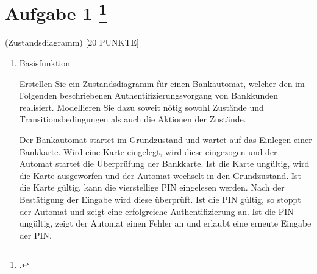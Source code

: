 \documentclass{lehramt-informatik-aufgabe}
\begin{document}
\section{Aufgabe 1
\footcite{66116:2020:03}}

 (Zustandsdiagramm) [20 PUNKTE]

\begin{enumerate}


\item Basisfunktion

Erstellen Sie ein Zustandsdiagramm für einen Bankautomat, welcher den im
Folgenden beschriebenen Authentifizierungsvorgang von Bankkunden
realisiert. Modellieren Sie dazu soweit nötig sowohl Zustände und
Transitionsbedingungen als auch die Aktionen der Zustände.

Der Bankautomat startet im Grundzustand und wartet auf das Einlegen
einer Bankkarte. Wird eine Karte eingelegt, wird diese eingezogen und
der Automat startet die Überprüfung der Bankkarte. Ist die Karte
ungültig, wird die Karte ausgeworfen und der Automat wechselt in den
Grundzustand. Ist die Karte gültig, kann die vierstellige PIN eingelesen
werden. Nach der Bestätigung der Eingabe wird diese überprüft. Ist die
PIN gültig, so stoppt der Automat und zeigt eine erfolgreiche
Authentifizierung an. Ist die PIN ungültig, zeigt der Automat einen
Fehler an und erlaubt eine erneute Eingabe der PIN.

\begin{liAntwort}
\end{liAntwort}


\end{enumerate}
\end{document}
